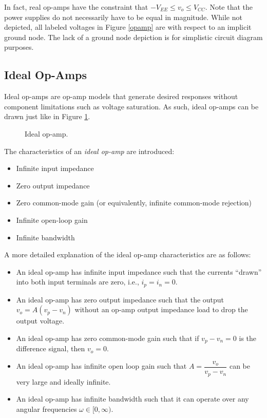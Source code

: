 \documentclass{report}
\begin{document}
In fact, real op-amps have the constraint that $-V_{EE} \leq v_o \leq V_{CC}$. Note that the power supplies do not necessarily have to be equal in magnitude. 
While not depicted, all labeled voltages in Figure \ref{opamp} are with respect to an implicit ground node. The lack of a ground node depiction is for 
simplistic circuit diagram purposes.

\subsection{Ideal Op-Amps}
Ideal op-amps are op-amp models that generate desired responses without component limitations such as voltage saturation. As such, ideal op-amps can be drawn just like in Figure \ref{ideal_opamp}.
\begin{figure}[!hbt]
    \centering
    \caption{Ideal op-amp.}
    \label{ideal_opamp}
\end{figure}
\begin{tcolorbox}[width=\textwidth,colback={white}, sharp corners]
The characteristics of an \emph{ideal op-amp} are introduced:
\begin{itemize}
    \item Infinite input impedance 
    \item Zero output impedance
    \item Zero common-mode gain (or equivalently, infinite common-mode rejection)
    \item Infinite open-loop gain
    \item Infinite bandwidth
\end{itemize}
\end{tcolorbox}
A more detailed explanation of the ideal op-amp characteristics are as follows:
\begin{itemize}
    \item An ideal op-amp has infinite input impedance such that the currents ``drawn'' into both input terminals are zero, i.e., $i_p=i_n=0$.
    \item An ideal op-amp has zero output impedance such that the output $v_o=A(v_p-v_n)$ without an op-amp output impedance load to drop the output voltage.
    \item An ideal op-amp has zero common-mode gain such that if $v_p-v_n=0$ is the difference signal, then $v_o=0$.
    \item An ideal op-amp has infinite open loop gain such that $A = \dfrac{v_o}{v_p - v_n}$ can be very large and ideally infinite.
    \item An ideal op-amp has infinite bandwidth such that it can operate over any angular frequencies $\omega\in[0,\infty)$.
\end{itemize}
\end{document}
